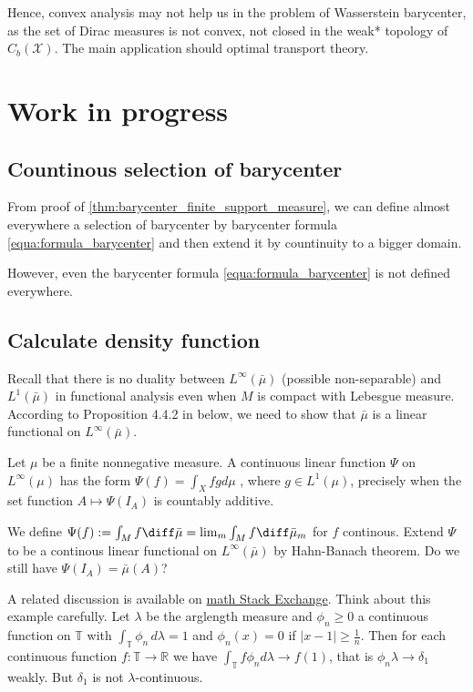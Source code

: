 \begin{rmk}
\begin{itemize}
	\end{itemize}
\end{rmk}

Hence, convex analysis may not help us in the problem of Wasserstein barycenter, as the set of Dirac measures is not convex, not closed in the weak* topology of $C_b(\mathcal{X})$. The main application should optimal transport theory.

\section{Work in progress}

\subsection{Countinous selection of barycenter}

From proof of \cref{thm:barycenter_finite_support_measure},
we can define almost everywhere a
selection of barycenter by barycenter formula \cref{equa:formula_barycenter}
and then extend it by countinuity to a bigger domain.

However,
even the barycenter formula \cref{equa:formula_barycenter} is not defined everywhere.

\subsection{Calculate density function}

Recall that there is no duality between $L^{\infty}(\bar{\mu})$ (possible non-separable) and $L^1 (\bar{\mu})$
in functional analysis even when $M$ is compact with Lebesgue measure.
According to Proposition 4.4.2 in \cite{Bogachev2007} below, we need to show that $\bar{\mu}$ is a linear functional on $L^{\infty}(\bar{\mu})$.
\begin{prop}
	Let \( \mu \) be a finite nonnegative measure.
	A continuous linear function \( \Psi \) on \( L ^ { \infty } ( \mu ) \) has the form
	\( \Psi ( f ) = \int _ { X } f g d \mu \)
	, where \( g \in L ^ { 1 } ( \mu ) \),
	precisely when the set function \( A \mapsto \Psi \left( I _ { A } \right) \) is countably additive.
\end{prop}
We define $\Psi(f):= \int_M f \diff \bar{\mu} = \lim_m \int_M f \diff \bar{\mu}_m$ for $f$ continous.
Extend $\Psi$ to be a continous linear functional on $L^{\infty}(\bar{\mu})$ by Hahn-Banach theorem.
Do we still have $\Psi(I_A) = \bar{\mu}(A)$?

A related discussion is available on
\href{https://math.stackexchange.com/questions/574130/does-weak-convergence-with-uniformly-bounded-densities-imply-absolute-continuity/574888#574888}{math Stack Exchange}.
Think about this example carefully.
Let $\lambda$ be the arglength measure and $\phi_n \ge 0$ a continuous function on $\mathbb T$ with $\int_{\mathbb T} \phi_n\, d\lambda = 1$ and $\phi_n(x) = 0$ if $|x-1| \ge \frac 1n$. Then for each continuous function $f\colon \mathbb T \to \mathbb R$ we have $\int_{\mathbb T} f\phi_n d\lambda \to f(1)$, that is $\phi_n \lambda \to \delta_1$ weakly. But $\delta_1$ is not $\lambda$-continuous.

